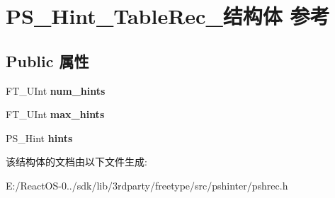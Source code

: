 \hypertarget{struct_p_s___hint___table_rec__}{}\section{P\+S\+\_\+\+Hint\+\_\+\+Table\+Rec\+\_\+结构体 参考}
\label{struct_p_s___hint___table_rec__}
\subsection*{Public 属性}
\begin{DoxyCompactItemize}
\item 
\mbox{\label{struct_p_s___hint___table_rec___a5734ff9130879de1e917e86950016ca9}} 
F\+T\+\_\+\+U\+Int {\bfseries num\+\_\+hints}
\item 
\mbox{\label{struct_p_s___hint___table_rec___abc4dd066a89f99a748ad1ed17f4af115}} 
F\+T\+\_\+\+U\+Int {\bfseries max\+\_\+hints}
\item 
\mbox{\label{struct_p_s___hint___table_rec___a131099e446ede3db7dd2756e24ad06bb}} 
P\+S\+\_\+\+Hint {\bfseries hints}
\end{DoxyCompactItemize}


该结构体的文档由以下文件生成\+:\begin{DoxyCompactItemize}
\item 
E\+:/\+React\+O\+S-\/0../sdk/lib/3rdparty/freetype/src/pshinter/pshrec.\+h\end{DoxyCompactItemize}
